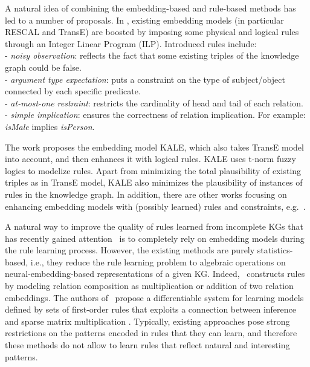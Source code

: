 A natural idea of combining the embedding-based and rule-based methods has led to a number of proposals.
In \cite{Wang2015KnowledgeBC}, existing embedding models (in particular RESCAL and TransE) are boosted by imposing some physical and logical rules through an Integer Linear Program (ILP). Introduced rules include:\\
\noindent- \textit{noisy observation}: reflects the fact that some existing triples of the knowledge graph could be false.\\
\noindent- \textit{argument type expectation}: puts a constraint on the type of subject/object connected by each specific predicate.\\
\noindent- \textit{at-most-one restraint}: restricts the cardinality of head and tail of each relation.\\
\noindent- \textit{simple implication}: ensures the correctness of relation implication. For example: \textit{isMale} implies \textit{isPerson}.

The work \cite{DBLP:conf/emnlp/GuoWWWG16} proposes the embedding model KALE, which also takes TransE model into account, and then enhances it with logical rules. KALE uses t-norm fuzzy logics to modelize rules. Apart from minimizing the total plausibility of existing triples as in TransE model, KALE also minimizes the plausibility of instances of rules in the knowledge graph. In addition, there are other works focusing on enhancing embedding models with (possibly learned) rules and constraints, e.g.~\cite{DBLP:journals/corr/abs-1711-11231,DBLP:conf/sigir/RastogiPD17}. 

A natural way to improve the quality of rules learned %
from incomplete KGs
that has recently gained attention~\cite{DBLP:journals/corr/YangYHGD14a,DBLP:conf/nips/YangYC17} is to completely rely on embedding models during the rule learning process. 
However, the existing methods are purely statistics-based, i.e., they reduce the rule learning problem to algebraic operations on neural-embedding-based representations of a given KG. Indeed,~\cite{DBLP:journals/corr/YangYHGD14a} constructs rules by modeling relation composition as multiplication or addition of two relation embeddings. The authors of~\cite{DBLP:conf/nips/YangYC17} propose a differentiable system for learning models defined by sets of first-order rules that exploits a connection between inference and sparse matrix multiplication \cite{DBLP:journals/corr/Cohen16b}. %
Typically, existing approaches pose strong restrictions on the patterns encoded in rules that they can learn, and therefore these methods do not allow to learn rules that reflect natural and interesting patterns.
